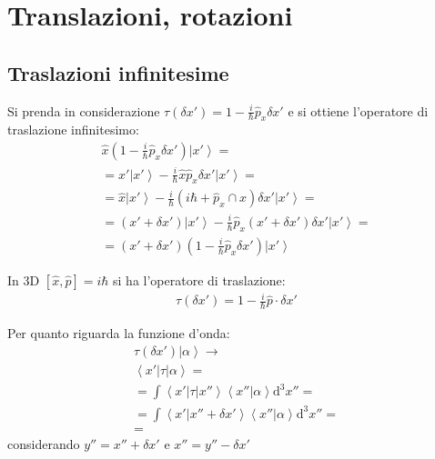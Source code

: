 \chapter{Translazioni, rotazioni} %
\section{Traslazioni infinitesime} %
Si prenda in considerazione $\tau\left(\delta x'\right)=1-\frac{i}{\hbar }\hat p_x\delta x'$ e si ottiene l'operatore di traslazione infinitesimo:
\begin{equation}\begin{split}
\hat x\left(1-\frac{i}{\hbar }\hat p_x\delta x'\right)\left |x' \right\rangle=\\
=x'\left |x' \right\rangle-\frac{i}{\hbar }\hat x\hat p_x\delta x'\left |x' \right\rangle=\\
=\hat x\left |x' \right\rangle-\frac{i}{\hbar }\left(i\hbar +\hat p_x\cap x\right)\delta x'\left |x' \right\rangle=\\
=\left(x'+\delta x'\right)\left |x' \right\rangle-\frac{i}{\hbar }\hat p_x\left(x'+\delta x'\right)\delta x'\left |x' \right\rangle=\\
=\left(x'+\delta x'\right)\left(1-\frac{i}{\hbar }\hat p_x\delta x'\right)\left |x' \right\rangle
\end{split}\end{equation}

In 3D $\left[\hat x,\hat p\right]=i\hbar $ si ha l'operatore di traslazione:
\begin{equation}\begin{split}
\tau\left(\delta x'\right)=1-\frac{i}{\hbar }\hat p\cdot \delta x'
\end{split}\end{equation}


Per quanto riguarda la funzione d'onda:
\begin{equation}\begin{split}
\tau\left(\delta x'\right)\left |\alpha \right\rangle \rightarrow \\
\left\langle x'\right |\tau\left |\alpha \right\rangle=\\
=\int{ \left\langle x'\right |\tau\left |x'' \right\rangle\left\langle x''|\alpha \right\rangle\textrm{d}^3x''}=\\
=\int{\left\langle x'|x''+\delta x' \right\rangle\left\langle x''|\alpha \right\rangle\textrm{d}^3x''}=\\
=%
\end{split}\end{equation}
considerando $y''=x''+\delta x'$ e $x''=y''-\delta x'$

